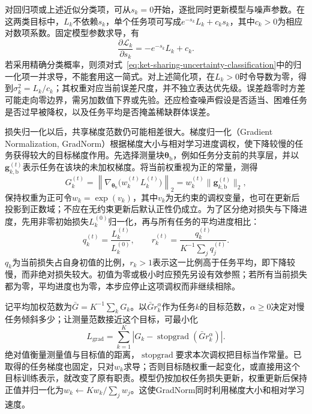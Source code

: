 对回归项或上述近似分类项，可从$s_k=0$开始，逐批同时更新模型与噪声参数。在这两类目标中，$L_k$不依赖$s_k$，单个任务项可写成$e^{-s_k}L_k+c_ks_k$，其中$c_k>0$为相应对数项系数。固定模型参数求导，有
\begin{equation}
  \frac{\partial\mathcal L_k}{\partial s_k}
  =-e^{-s_k}L_k+c_k.
\end{equation}
若采用精确分类概率，则须对式~\eqref{eq:ket-sharing-uncertainty-classification}中的归一化项一并求导，不能套用这一简式。对上述简化项，在$L_k>0$时令导数为零，得到$\sigma_k^2=L_k/c_k$；其权重对应当前误差尺度，并不独立表达优先级。误差趋零时方差可能走向零边界，需另加数值下界或先验。还应检查噪声假设是否适当、困难任务是否过早被降权，以及任务平均是否掩盖稀缺群体误差。

损失归一化以后，共享梯度范数仍可能相差很大。梯度归一化（Gradient Normalization, GradNorm）根据梯度大小与相对学习进度调权，使下降较慢的任务获得较大的目标梯度作用。先选择测量块$\bm{\theta}_{\mathrm b}$，例如任务分支前的共享层，并以$\bm g_{k,\mathrm b}^{(t)}$表示任务在该块的未加权梯度。将当前权重视为正的常量，测得
\begin{equation}
  G_k^{(t)}
  =\left\|\nabla_{\bm{\theta}_{\mathrm b}}
     \bigl(w_k^{(t)}L_k^{(t)}\bigr)\right\|_2
  =w_k^{(t)}\|\bm g_{k,\mathrm b}^{(t)}\|_2,
  \label{eq:ket-sharing-gradnorm-size}
\end{equation}
保持权重为正可令$w_k=\exp(v_k)$，其中$v_k$为无约束的调权变量，也可在更新后投影到正数域；不应在无约束更新后默认正性仍成立。为了区分绝对损失与下降进度，先用非零初始损失$L_k^{(0)}$归一化，再与所有任务的平均进度相比：
\begin{equation}
  q_k^{(t)}=\frac{L_k^{(t)}}{L_k^{(0)}},
  \qquad
  r_k^{(t)}
  =\frac{q_k^{(t)}}{K^{-1}\sum_jq_j^{(t)}}.
  \label{eq:ket-sharing-gradnorm-rate}
\end{equation}
$q_k$为当前损失占自身初值的比例，$r_k>1$表示这一比例高于任务平均，即下降较慢，而非绝对损失较大。初值为零或极小时应预先另设有效参照；若所有当前损失都为零，平均进度也为零，本步应停止这项调权而非继续相除。

记平均加权范数为$\bar G=K^{-1}\sum_kG_k$。以$\bar G r_k^\alpha$作为任务$k$的目标范数，$\alpha\geq0$决定对慢任务倾斜多少；让测量范数接近这个目标，可最小化
\begin{equation}
  L_{\mathrm{grad}}
  =\sum_{k=1}^{K}
  \left|G_k-
    \operatorname{stopgrad}(\bar G r_k^\alpha)\right|.
  \label{eq:ket-sharing-gradnorm-objective}
\end{equation}
绝对值衡量测量值与目标值的距离，$\operatorname{stopgrad}$要求本次调权把目标当作常量。已取得的任务梯度也固定，只对$w_k$求导；否则目标随权重一起变化，或直接用这个目标训练表示，就改变了原有职责。模型仍按加权任务损失更新，权重更新后保持正值并归一化为$w_k\leftarrow Kw_k/\sum_jw_j$。这使GradNorm同时利用梯度大小和相对学习速度。

